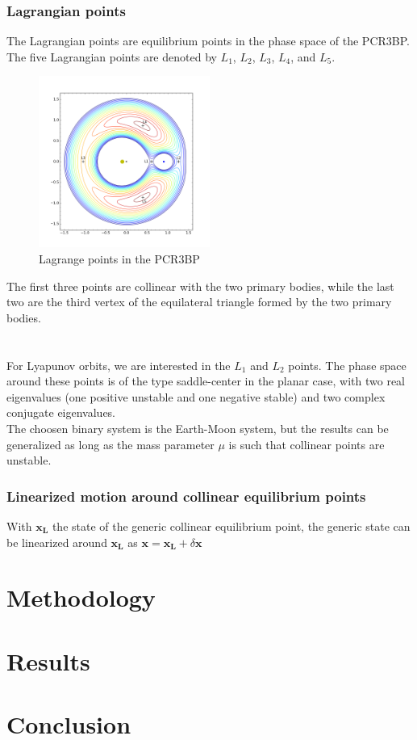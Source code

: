 \documentclass{report}
\begin{document}
\subsection{Lagrangian points}

The Lagrangian points are equilibrium points in the phase space of the PCR3BP. 
The five Lagrangian points are denoted by $L_1$, $L_2$, $L_3$, $L_4$, and $L_5$. 
\begin{figure}
    \centering
    \includegraphics[width=0.5\textwidth]{images/Contour lines for Lagrange points.png}
    \caption{Lagrange points in the PCR3BP}
    \label{fig:lagrange_points}
\end{figure}
The first three points are collinear with the two primary bodies, while the last two are the 
third vertex of the equilateral triangle formed by the two primary bodies.\\\\\\
For Lyapunov orbits, we are interested in the $L_1$ and $L_2$ points. The phase space around
these points is of the type saddle-center in the planar case, with two real eigenvalues (one positive unstable
and one negative stable) and two complex conjugate eigenvalues.\\
The choosen binary system is the Earth-Moon system, but the results can be generalized
as long as the mass parameter $\mu$ is such that collinear points are unstable.

\subsection{Linearized motion around collinear equilibrium points}
With $\boldsymbol{x_L}$ the state of the generic collinear equilibrium point, the generic state
can be linearized around $\boldsymbol{x_L}$ as $\boldsymbol{x} = \boldsymbol{x_L} + \delta\boldsymbol{x}$

\chapter{Methodology}

\chapter{Results}

\chapter{Conclusion}
\end{document}
